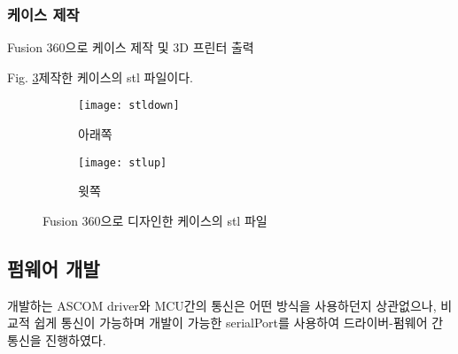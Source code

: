\subsubsection{케이스 제작}

Fusion 360으로 케이스 제작 및 3D 프린터 출력


Fig. \ref{fig:stl}\은 제작한 케이스의 stl 파일이다. 

\begin{figure}[h]
	\begin{center}
		\begin{subfigure}{0.45\textwidth}
			\texttt{[image: stldown]} 
			\caption{아래쪽}
			\label{fig:stldown}
		\end{subfigure}
		\begin{subfigure}{0.45\textwidth}
			\texttt{[image: stlup]}
			\caption{윗쪽}
			\label{fig:stlup}
		\end{subfigure}
		\caption{Fusion 360으로 디자인한 케이스의 stl 파일}
		\label{fig:stl}
	\end{center}
\end{figure}




\subsection{펌웨어 개발}

개발하는 ASCOM driver와 MCU간의 통신은 어떤 방식을 사용하던지 상관없으나, 비교적 쉽게 통신이 가능하며 개발이 가능한 serialPort를 사용하여 드라이버-펌웨어 간 통신을 진행하였다.


